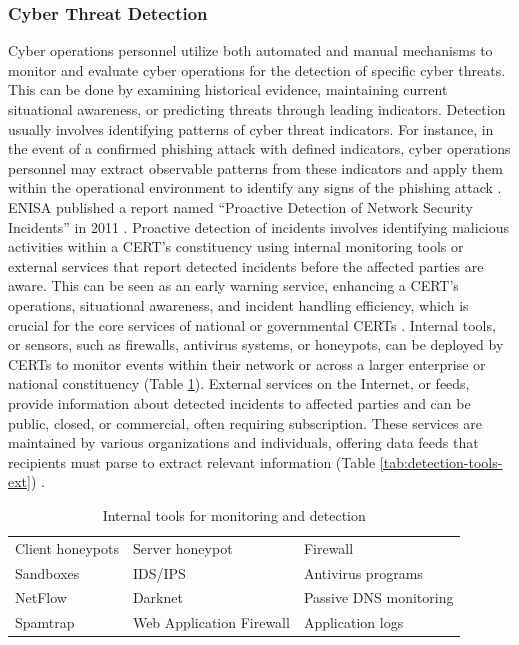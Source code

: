 \subsubsection{Cyber Threat Detection}
Cyber operations personnel utilize both automated and manual mechanisms to monitor and evaluate cyber operations for the detection of specific cyber threats. This can be done by examining historical evidence, maintaining current situational awareness, or predicting threats through leading indicators. Detection usually involves identifying patterns of cyber threat indicators. For instance, in the event of a confirmed phishing attack with defined indicators, cyber operations personnel may extract observable patterns from these indicators and apply them within the operational environment to identify any signs of the phishing attack \cite{barnum_stix_2012}.
ENISA published a report named “Proactive Detection of Network Security Incidents” in 2011 \cite{noauthor_proactive_nodate}. Proactive detection of incidents involves identifying malicious activities within a CERT's constituency using internal monitoring tools or external services that report detected incidents before the affected parties are aware. This can be seen as an early warning service, enhancing a CERT's operations, situational awareness, and incident handling efficiency, which is crucial for the core services of national or governmental CERTs \cite{noauthor_proactive_nodate}. Internal tools, or sensors, such as firewalls, antivirus systems, or honeypots, can be deployed by CERTs to monitor events within their network or across a larger enterprise or national constituency (Table \ref{tab:detection-tools}). 
External services on the Internet, or feeds, provide information about detected incidents to affected parties and can be public, closed, or commercial, often requiring subscription. These services are maintained by various organizations and individuals, offering data feeds that recipients must parse to extract relevant information (Table \ref{tab:detection-tools-ext}) \cite{noauthor_proactive_nodate}.


\begin{table}[ht]
\caption{Internal tools for monitoring and detection \cite{noauthor_proactive_nodate}}
\label{tab:detection-tools}
\begin{tabular}{lll}
    \hline
    Client honeypots &
    Server honeypot &
    Firewall \\
    Sandboxes &
    IDS/IPS &
    Antivirus programs \\
    NetFlow &
    Darknet &
    Passive DNS monitoring \\
    Spamtrap &
    Web Application Firewall &
    Application logs \\
\end{tabular}
\end{table}

